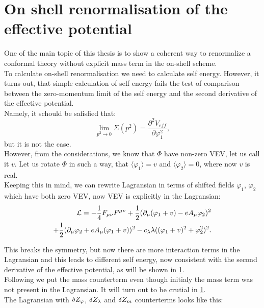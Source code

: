 \chapter{On shell renormalisation of the effective potential}

One of the main topic of this thesis is to show a coherent way to renormalize a conformal theory 
without explicit mass term in the on-shell scheme. \\


To calculate on-shell renormalisation we need to calculate self energy. 
However, it turns out, that simple calculation of self energy fails the test of 
comparison between the zero-momentum limit of the self energy and the second derivative 
of the effective potential. \\
Namely, it schould be safisfied that:
\begin{equation}
\lim\limits_{p^2\to 0}\Sigma(p^2)=\frac{\partial^2V_{eff}}{\partial\varphi_1^2},
\end{equation}
but it is not the case. \\

However, from the \MSbar considerations, we know that $\Phi$ have non-zero VEV, let us 
call it $v$. 
Let us rotate $\Phi$ in such a way, that $\langle\varphi_1\rangle=v$ and $\langle\varphi_2\rangle 
= 0$, where now $v$ is real. \\
Keeping this in mind, we can rewrite Lagransian in terms of shifted fields $\varphi_1$, 
$\varphi_2$ which have both zero VEV, now VEV is explicitly in the Lagransian:
\begin{align}
\mathcal{L} = -\frac{1}{4}F_{\mu\nu}F^{\mu\nu}+ 
\frac{1}{2}(\partial_\mu(\varphi_1+v) - eA_\mu\varphi_2)^2\\
+\frac{1}{2}(\partial_\mu\varphi_2+eA_\mu(\varphi_1+v))^2
-c_\lambda\lambda((\varphi_1+v)^2+\varphi_2^2)^2. \notag
\end{align}

This breaks the symmetry, but now there are more interaction terms in the Lagransian and this leads 
to different self energy, now consistent with the second derivative of the effective potential, 
as will be shown in \ref{}. \\ 

Following \cite{Coleman1973} we put the mass counterterm even though initialy the mass term 
was not present in the Lagransian. It will turn out to be crutial in \ref{}. \\ 
The Lagransian with $\delta Z_\varphi$, $\delta Z_\lambda$ and $\delta Z_m$ counterterms looks like this:

